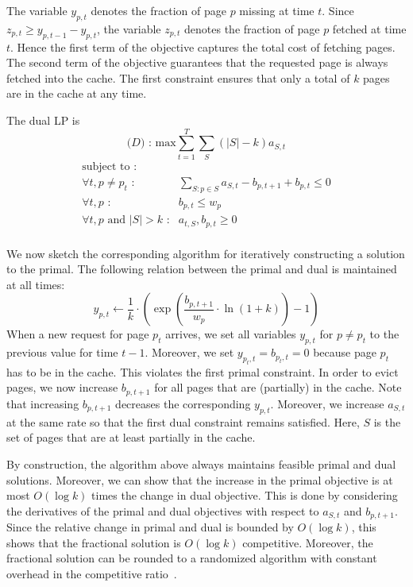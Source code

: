 The variable $y_{p,t}$ denotes the fraction of page $p$ missing at time $t$.
Since $z_{p,t} \geq y_{p,t-1} - y_{p,t}$, the variable $z_{p,t}$ denotes the fraction of page $p$ fetched at time $t$.
Hence the first term of the objective captures the total cost of fetching pages.
The second term of the objective guarantees that the requested page is always fetched into the cache.
The first constraint ensures that only a total of $k$ pages are in the cache at any time.

The dual LP is
\[
\textrm{($D$) : max}  \sum_{t=1}^T\sum_S (|S| - k) a_{S,t}
\]
\[
	\begin{array}{lr}
	\textrm{subject to :} & \\
	\forall t,p \neq p_t \textrm{ :} & \sum_{S: p \in S} a_{S,t} - b_{p, t+1} + b_{p,t} \leq 0 \\
	\forall t,p \textrm{ :} & b_{p,t} \leq w_p \\
	\forall t,p \textrm{ and } |S| > k \textrm{ :} & a_{t,S}, b_{p,t} \geq 0 \\
	\end{array}
\]

We now sketch the corresponding algorithm for iteratively constructing a solution to the primal.
The following relation between the primal and dual is maintained at all times:
\[
y_{p,t} \leftarrow \frac{1}{k} \cdot \left( \exp \left( \frac{b_{p,t+1}}{w_p} \cdot \ln(1+k) \right) - 1 \right)
\]
When a new request for page $p_t$ arrives, we set all variables $y_{p,t}$ for $p \neq p_t$ to the previous value for time $t-1$.
Moreover, we set $y_{p_t, t} = b_{p_t, t} = 0$ because page $p_t$ has to be in the cache.
This violates the first primal constraint.
In order to evict pages, we now increase $b_{p, t+1}$ for all pages that are (partially) in the cache.
Note that increasing $b_{p, t+1}$ decreases the corresponding $y_{p,t}$.
Moreover, we increase $a_{S,t}$ at the same rate so that the first dual constraint remains satisfied.
Here, $S$ is the set of pages that are at least partially in the cache.

By construction, the algorithm above always maintains feasible primal and dual solutions.
Moreover, we can show that the increase in the primal objective is at most $O(\log k)$ times the change in dual objective.
This is done by considering the derivatives of the primal and dual objectives with respect to $a_{S,t}$ and $b_{p,t+1}$.
Since the relative change in primal and dual is bounded by $O(\log k)$, this shows that the fractional solution is $O(\log k)$ competitive.
Moreover, the fractional solution can be rounded to a randomized algorithm with constant overhead in the competitive ratio~\cite{bansal07:weighted-paging}.


